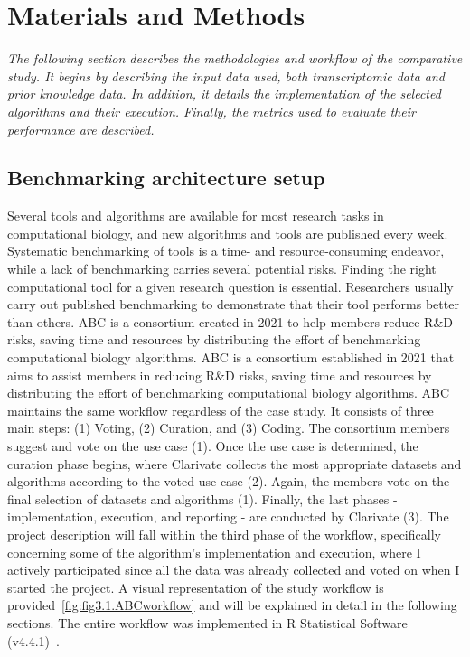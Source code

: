 ﻿%

%


\chapter{Materials and Methods}
\label{cha:materialsandmethods}


\textit{The following section describes the methodologies and workflow of the comparative study. It begins by describing the input data used, both transcriptomic data and prior knowledge data. In addition, it details the implementation of the selected algorithms and their execution. Finally, the metrics used to evaluate their performance are described.}

\section{Benchmarking architecture setup} %
\label{sec:benchmarkingarchitecturesetup}

Several tools and algorithms are available for most research tasks in computational biology, and new algorithms and tools are published every week. Systematic benchmarking of tools is a time- and resource-consuming endeavor, while a lack of benchmarking carries several potential risks. Finding the right computational tool for a given research question is essential. Researchers usually carry out published benchmarking to demonstrate that their tool performs better than others. \gls{ABC} is a consortium created in 2021 to help members reduce R\&D risks, saving time and resources by distributing the effort of benchmarking computational biology algorithms. \gls{ABC} is a consortium established in 2021 that aims to assist members in reducing R\&D risks, saving time and resources by distributing the effort of benchmarking computational biology algorithms. \gls{ABC} maintains the same workflow regardless of the case study. It consists of three main steps: (1) Voting, (2) Curation, and (3) Coding. The consortium members suggest and vote on the use case (1). Once the use case is determined, the curation phase begins, where Clarivate collects the most appropriate datasets and algorithms according to the voted use case (2). Again, the members vote on the final selection of datasets and algorithms (1). Finally, the last phases - implementation, execution, and reporting - are conducted by Clarivate (3). 
The project description will fall within the third phase of the workflow, specifically concerning some of the algorithm's implementation and execution, where I actively participated since all the data was already collected and voted on when I started the project. A visual representation of the study workflow is provided~\ref{fig:fig3.1.ABCworkflow} and will be explained in detail in the following sections. The entire workflow was implemented in \gls{R} Statistical Software (v4.4.1)~\cite{RN159}.

